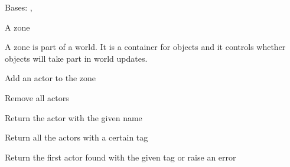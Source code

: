 \documentclass[letterpaper,10pt,english]{sphinxmanual}
\begin{document}
\begin{fulllineitems}
\label{zone:serge.zone.Zone}
Bases: {\hyperref[geometry:serge.geometry.Rectangle]{}}, {\hyperref[common:serge.common.Loggable]{}}

A zone

A zone is part of a world. It is a container for objects
and it controls whether objects will take part in world 
updates.

\begin{fulllineitems}
\label{zone:serge.zone.Zone.addActor}
Add an actor to the zone

\end{fulllineitems}


\begin{fulllineitems}
\label{zone:serge.zone.Zone.clearActors}
Remove all actors

\end{fulllineitems}


\begin{fulllineitems}
\label{zone:serge.zone.Zone.findActorByName}
Return the actor with the given name

\end{fulllineitems}


\begin{fulllineitems}
\label{zone:serge.zone.Zone.findActorsByTag}
Return all the actors with a certain tag

\end{fulllineitems}


\begin{fulllineitems}
\label{zone:serge.zone.Zone.findFirstActorByTag}
Return the first actor found with the given tag or raise an error


\end{fulllineitems}
\end{fulllineitems}
\end{document}
